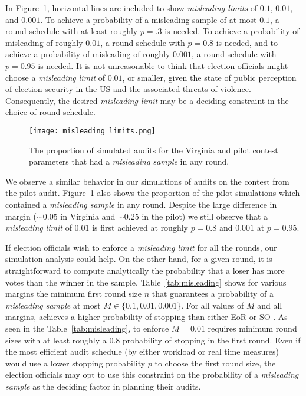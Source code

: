 In Figure~\ref{fig:misleading}, horizontal lines are included to show \emph{misleading limits} of $0.1$, $0.01$, and $0.001$.
To achieve a probability of a misleading sample of at most $0.1$, a round schedule with at least roughly $p=.3$ is needed.
To achieve a probability of misleading of roughly $0.01$, a round schedule with $p=0.8$ is needed, and to achieve a probability of misleading of roughly $0.001$, a round schedule with $p=0.95$ is needed.
It is not unreasonable to think that election officials might choose a \emph{misleading limit} of $0.01$, or smaller, given the state of public perception of election security in the US and the associated threats of violence.
Consequently, the desired \emph{misleading limit} may be a deciding constraint in the choice of round schedule. 

\begin{figure}
\texttt{[image: misleading\_limits.png]}
\caption{The proportion of simulated \Providence audits for the Virginia and pilot contest parameters that had a \emph{misleading sample} in any round.}
\label{fig:misleading}
\end{figure}

We observe a similar behavior in our simulations of audits on the contest from the pilot audit. Figure~\ref{fig:misleading} also shows the proportion of the pilot simulations which contained a \emph{misleading sample} in any round. Despite the large difference in margin ($\sim 0.05$ in Virginia and $\sim 0.25$ in the pilot) we still observe that a \emph{misleading limit} of $0.01$ is first achieved at roughly $p=0.8$ and $0.001$ at $p=0.95$.


If election officials wish to enforce a \emph{misleading limit} for all the rounds, our simulation analysis could help. On the other hand, for a given round, it is straightforward to compute analytically the probability that a loser has more votes than the winner in the sample. Table~\ref{tab:misleading} shows for various margins the minimum first round size $n$ that guarantees a probability of a \emph{misleading sample} at most $M\in\{0.1,0.01,0.001\}$. For all values of $M$ and all margins, \Providence achieves a higher probability of stopping than either EoR \BRAVO or SO \BRAVO. 
    As seen in the Table~\ref{tab:misleading}, to enforce $M=0.01$ requires minimum round sizes with at least roughly a $0.8$ probability of stopping in the first round. Even if the most efficient audit schedule (by either workload or real time measures) would use a lower stopping probability $p$ to choose the first round size, the election officials may opt to use this constraint on the probability of a \emph{misleading sample} as the deciding factor in planning their audits.

